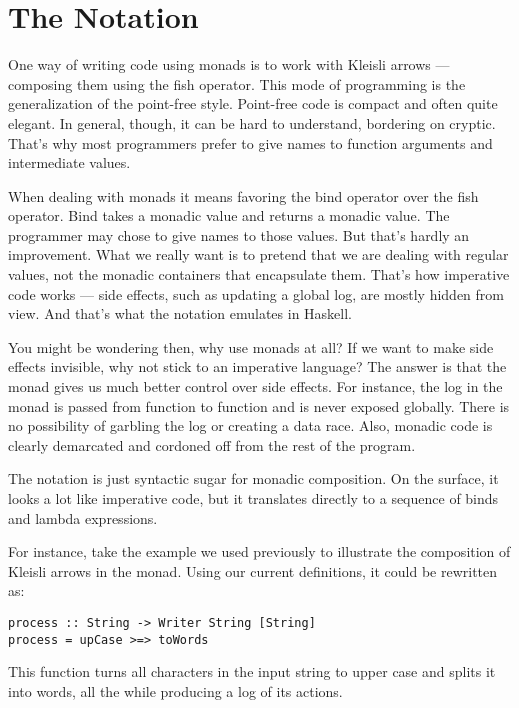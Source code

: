 \section{\texorpdfstring{The 
Notation}{The do Notation}}\label{the-do-notation}

One way of writing code using monads is to work with Kleisli arrows ---
composing them using the fish operator. This mode of programming is the
generalization of the point-free style. Point-free code is compact and
often quite elegant. In general, though, it can be hard to understand,
bordering on cryptic. That's why most programmers prefer to give names
to function arguments and intermediate values.

When dealing with monads it means favoring the bind operator over the
fish operator. Bind takes a monadic value and returns a monadic value.
The programmer may chose to give names to those values. But that's
hardly an improvement. What we really want is to pretend that we are
dealing with regular values, not the monadic containers that encapsulate
them. That's how imperative code works --- side effects, such as
updating a global log, are mostly hidden from view. And that's what the
 notation emulates in Haskell.

You might be wondering then, why use monads at all? If we want to make
side effects invisible, why not stick to an imperative language? The
answer is that the monad gives us much better control over side effects.
For instance, the log in the  monad is passed from
function to function and is never exposed globally. There is no
possibility of garbling the log or creating a data race. Also, monadic
code is clearly demarcated and cordoned off from the rest of the
program.

The  notation is just syntactic sugar for monadic
composition. On the surface, it looks a lot like imperative code, but it
translates directly to a sequence of binds and lambda expressions.

For instance, take the example we used previously to illustrate the
composition of Kleisli arrows in the  monad. Using our
current definitions, it could be rewritten as:

\begin{verbatim}
process :: String -> Writer String [String]
process = upCase >=> toWords
\end{verbatim}
This function turns all characters in the input string to upper case and
splits it into words, all the while producing a log of its actions.

